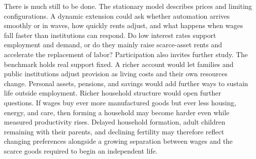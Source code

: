 \documentclass[12pt]{article}
\theoremstyle{plain}
\theoremstyle{definition}
\theoremstyle{remark}
\begin{document}
There is much still to be done. The stationary model describes prices and limiting configurations. A dynamic extension could ask whether automation arrives smoothly or in waves, how quickly rents adjust, and what happens when wages fall faster than institutions can respond. Do low interest rates support employment and demand, or do they mainly raise scarce-asset rents and accelerate the replacement of labor?
Participation also invites further study. The benchmark holds real support fixed. A richer account would let families and public institutions adjust provision as living costs and their own resources change. Personal assets, pensions, and savings would add further ways to sustain life outside employment. Richer household structure would open further questions. If wages buy ever more manufactured goods but ever less housing, energy, and care, then forming a household may become harder even while measured productivity rises. Delayed household formation, adult children remaining with their parents, and declining fertility may therefore reflect changing preferences alongside a growing separation between wages and the scarce goods required to begin an independent life.
\end{document}
